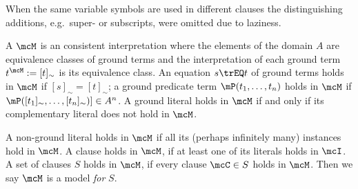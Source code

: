 %
\begin{remark}
When the same variable symbols are used in different clauses the distinguishing additions, e.g.~super- or subscripts, were omitted due to laziness.
\end{remark}
%
%
\begin{definition}\label{def:model}
A  $\mcM$ is an consistent interpretation where the elements of the domain $A$
are equivalence classes of ground terms
and the interpretation of each ground term $t^\mcM := [t]_\sim$ is its equivalence class.
An equation $s\trEQ t$ of ground terms holds in $\mcM$ if $[s]_\sim=[t]_\sim$;
a ground predicate term $\mP(t_1,\ldots,t_n)$ holds in $\mcM$ if $\mP([t_1]_\sim,\ldots,[t_n]_\sim)] \in A^n$.
A ground literal holds in $\mcM$ if and only if its complementary literal does not hold in $\mcM$.

A non-ground literal holds in $\mcM$ if all its
(perhaps infinitely many)
instances hold in $\mcM$.
A clause holds in $\mcM$, if at least one of its literals holds in $\mcI$.
A set of clauses $S$ holds in $\mcM$, if every clause $\mcC\in S$ holds in $\mcM$.
Then we say $\mcM$ is a model {\em for} $S$.

\end{definition}
%
%

